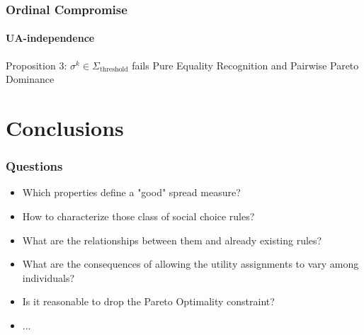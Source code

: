 \documentclass{beamer}
\newcommand{\SThreshold}{\Sigma_\text{threshold}}
\begin{document}
\begin{frame}
	\frametitle{Ordinal Compromise}
	\framesubtitle{UA-independence}
	\begin{block}{Proposition 3:}
		$\sigma^k \in \SThreshold$ fails Pure Equality Recognition and Pairwise Pareto Dominance
	\end{block}
	
\end{frame}

\section{Conclusions}
\begin{frame}
	\frametitle{Questions}
	\begin{itemize}
		\item <1-> Which properties define a "good" spread measure?
		\item <2-> How to characterize those class of social choice rules? 
		\item <3-> What are the relationships between them and already existing rules?
		\item <4-> What are the consequences of allowing the utility assignments to vary among individuals?
		\item <5-> Is it reasonable to drop the Pareto Optimality constraint?
		\item <6-> $\dots$
	\end{itemize}
\end{frame}
\end{document}
